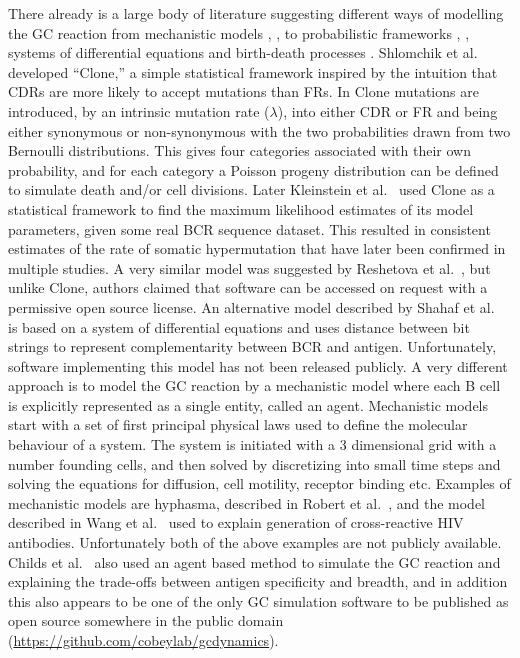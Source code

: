 There already is a large body of literature suggesting different ways of modelling the GC reaction from mechanistic models \cite{Childs_Baskerville_Cobey_2015}, \cite{robert2017simulate}, to probabilistic frameworks \cite{shlomchik1998clone}, \cite{Reshetova_2017}, systems of differential equations \cite{shahaf2008antigen} and birth-death processes \cite{Balelli_2016}.
Shlomchik et al.\ \cite{shlomchik1998clone} developed ``Clone,'' a simple statistical framework inspired by the intuition that CDRs are more likely to accept mutations than FRs.
In Clone mutations are introduced, by an intrinsic mutation rate ($\lambda$), into either CDR or FR and being either synonymous or non-synonymous with the two probabilities drawn from two Bernoulli distributions.
This gives four categories associated with their own probability, and for each category a Poisson progeny distribution can be defined to simulate death and/or cell divisions.
Later Kleinstein et al.\ \cite{kleinstein2003estimating} used Clone as a statistical framework to find the maximum likelihood estimates of its model parameters, given some real BCR sequence dataset.
This resulted in consistent estimates of the rate of somatic hypermutation that have later been confirmed in multiple studies.
A very similar model was suggested by Reshetova et al.\ \cite{Reshetova_2017}, but unlike Clone, authors claimed that software can be accessed on request with a permissive open source license.
An alternative model described by Shahaf et al.\ \cite{shahaf2008antigen} is based on a system of differential equations and uses distance between bit strings to represent complementarity between BCR and antigen.
Unfortunately, software implementing this model has not been released publicly.
A very different approach is to model the GC reaction by a mechanistic model where each B cell is explicitly represented as a single entity, called an agent.
Mechanistic models start with a set of first principal physical laws used to define the molecular behaviour of a system.
The system is initiated with a 3 dimensional grid with a number founding cells, and then solved by discretizing into small time steps and solving the equations for diffusion, cell motility, receptor binding etc.
Examples of mechanistic models are hyphasma, described in Robert et al.\ \cite{robert2017simulate}, and the model described in Wang et al.\ \cite{wang2015manipulating} used to explain generation of cross-reactive HIV antibodies.
Unfortunately both of the above examples are not publicly available.
Childs et al.\ \cite{Childs_Baskerville_Cobey_2015} also used an agent based method to simulate the GC reaction and explaining the trade-offs between antigen specificity and breadth, and in addition this also appears to be one of the only GC simulation software to be published as open source somewhere in the public domain (\url{https://github.com/cobeylab/gcdynamics}).

